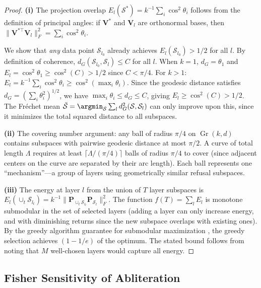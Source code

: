 \begin{proof}
\textbf{(i)} The projection overlap $E_l(\mathcal{S}^*) = k^{-1}\sum_i \cos^2\theta_i$ follows from the definition of principal angles: if $\mathbf{V}^*$ and $\mathbf{V}_l$ are orthonormal bases, then $\|\mathbf{V}^{*\top}\mathbf{V}_l\|_F^2 = \sum_i \cos^2\theta_i$.

We show that \emph{any} data point $\mathcal{S}_{l_0}$ already achieves $E_l(\mathcal{S}_{l_0}) > 1/2$ for all $l$.
By definition of coherence, $d_G(\mathcal{S}_{l_0}, \mathcal{S}_l) \leq C$ for all $l$.
When $k=1$, $d_G = \theta_1$ and $E_l = \cos^2\theta_1 \geq \cos^2(C) > 1/2$ since $C < \pi/4$.
For $k > 1$: $E_l = k^{-1}\sum_i \cos^2\theta_i \geq \cos^2(\max_i \theta_i)$.
Since the geodesic distance satisfies $d_G = (\sum_i \theta_i^2)^{1/2}$, we have $\max_i \theta_i \leq d_G \leq C$, giving $E_l \geq \cos^2(C) > 1/2$.
The Fr\'echet mean $\bar{\mathcal{S}} = \argmin_{\mathcal{S}} \sum_l d_G^2(\mathcal{S}, \mathcal{S}_l)$ can only improve upon this, since it minimizes the total squared distance to all subspaces.

\textbf{(ii)} The covering number argument: any ball of radius $\pi/4$ on $\operatorname{Gr}(k,d)$ contains subspaces with pairwise geodesic distance at most $\pi/2$.
A curve of total length $\Lambda$ requires at least $\lceil \Lambda / (\pi/4) \rceil$ balls of radius $\pi/4$ to cover (since adjacent centers on the curve are separated by their arc length).
Each ball represents one ``mechanism''---a group of layers using geometrically similar refusal subspaces.

\textbf{(iii)} The energy at layer $l$ from the union of $T$ layer subspaces is $E_l(\cup_t \mathcal{S}_{l_t}) = k^{-1}\|\mathbf{P}_{\cup_t \mathcal{S}_{l_t}} \mathbf{P}_{\mathcal{S}_l}\|_F^2$.
The function $f(T) = \sum_l E_l$ is monotone submodular in the set of selected layers (adding a layer can only increase energy, and with diminishing returns since the new subspace overlaps with existing ones).
By the greedy algorithm guarantee for submodular maximization \citep{nemhauser1978analysis}, the greedy selection achieves $(1-1/e)$ of the optimum. The stated bound follows from noting that $M$ well-chosen layers would capture all energy.
\end{proof}

\subsection{Fisher Sensitivity of Abliteration}
\label{app:fisher_sensitivity}


